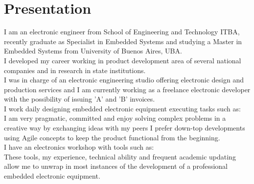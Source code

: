 \section{Presentation}
I am an electronic engineer from School of Engineering and Technology ITBA,
recently graduate as Specialist in Embedded Systems and studying a
Master in Embedded Systems from University of Buenos Aires, UBA.\\
I developed my career working in product development area of several
national companies and in research in state institutions.\\
I was in charge of an electronic engineering studio offering electronic design
and production services and I am currently working as a freelance electronic
developer with the possibility of issuing 'A' and 'B' invoices.\\
I work daily designing embedded electronic equipment executing tasks such as: \\
I am very pragmatic, committed and enjoy solving complex problems in a creative way by exchanging ideas
with my peers I prefer down-top developments using Agile concepts to keep the product functional from
the beginning.\\
I have an electronics workshop with tools such as:\\
These tools, my experience, technical ability and frequent academic updating allow me to unwrap
in most instances of the development of a professional embedded electronic equipment.\\
